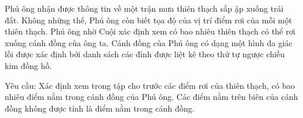 Phú ông nhận được thông tin về một trận mưa thiên thạch sắp ập xuống trái đất. Không những thế, Phú ông còn biết tọa độ của vị trí điểm rơi của mỗi một thiên thạch. Phú ông nhờ Cuội xác định xem có bao nhiêu thiên thạch có thể rơi xuống cánh đồng của ông ta. Cánh đồng của Phú ông có dạng một hình đa giác lồi được xác định bởi danh sách các đỉnh được liệt kê theo thứ tự ngược chiều kim đồng hồ.   


       Yêu cầu:      Xác định xem trong tập cho trước các điểm rơi của thiên thạch, có bao nhiêu điểm nằm trong cánh đồng của Phú ông. Các điểm nằm trên biên của cánh đồng không được tính là điểm nằm trong cánh đồng.